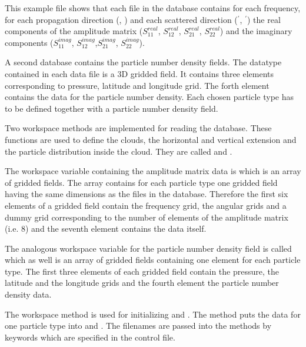 This example file shows that each file in the database contains
for each frequency, for each propagation
direction (\ScaZa, \ScaAa) and each scattered direction
 (\ScaZa$^\prime$, \ScaAa$^\prime$) the real
components of the amplitude matrix ($S^{real}_{11}$, $S^{real}_{12}$,
$S^{real}_{21}$, $S^{real}_{22}$) and the imaginary components
($S^{imag}_{11}$, $S^{imag}_{12}$,$S^{imag}_{21}$, $S^{imag}_{22}$).

\label{sec:scattering:pnd_data}

A second database contains the particle number density fields. 
The datatype contained in each data file is a
3D gridded field. It contains three elements corresponding to 
pressure, latitude and longitude grid. The forth element contains the
data for the particle number density. Each chosen particle type 
has to be defined together with a
particle number density field.

\label{sec:scattering:read_data}

Two workspace methods are implemented for reading the database. These
functions are used to define the clouds, the horizontal and vertical
extension and the particle distribution inside the cloud. They
are called  and . 

The workspace variable containing the amplitude matrix data is
 which is an array of gridded fields. The
array contains for each particle type one gridded field having the
same dimensions as the files in the database. Therefore the first six
elements of a gridded field contain the
frequency grid, the angular grids and a dummy grid corresponding
to the number of
elements of the amplitude matrix (i.e. 8) and the seventh element 
contains the data itself.

The analogous workspace variable for the particle number density
field is called  which as well is an array of
gridded fields containing one element for each particle type. The
first three elements of each gridded field contain the pressure, the
latitude and the longitude grids and the fourth element the particle
number density data. 

The workspace method  is used for initializing
 and . 
The method  puts the data for one particle
type into  and . The
filenames are passed into the methods by keywords which are specified
in the control file.

